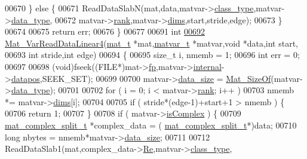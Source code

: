 \begin{DoxyCode}
{{{00670     \} \textcolor{keywordflow}{else} \{
00671         ReadDataSlabN(mat,data,matvar->\hyperlink{group___m_a_t_aff13035bf3265dd7d9425e5d40c839d4}{class\_type},matvar->\hyperlink{group___m_a_t_ab6aafe9bd77f0f077852593dec438144}{data\_type},
00672             matvar->\hyperlink{group___m_a_t_a84ba70c96ded13cc555fa75b768d9921}{rank},matvar->\hyperlink{group___m_a_t_a8e01234e1c862ce3472bb37f5a09b92c}{dims},start,stride,edge);
00673     \}
00674 
00675     \textcolor{keywordflow}{return} err;
00676 \}
00677 
00691 \textcolor{keywordtype}{int}
\hyperlink{group___m_a_t_gab9f3d6b362bfa1fa92ed2afb8281cff4}{00692} \hyperlink{group___m_a_t_gab9f3d6b362bfa1fa92ed2afb8281cff4}{Mat\_VarReadDataLinear4}(\hyperlink{struct__mat__t}{mat\_t} *mat,\hyperlink{group___m_a_t_structmatvar__t}{matvar\_t} *matvar,\textcolor{keywordtype}{void} *data,\textcolor{keywordtype}{int} start,
00693                        \textcolor{keywordtype}{int} stride,\textcolor{keywordtype}{int} edge)
00694 \{
00695     \textcolor{keywordtype}{size\_t} i, nmemb = 1;
00696     \textcolor{keywordtype}{int} err = 0;
00697 
00698     (void)fseek((FILE*)mat->\hyperlink{struct__mat__t_a85f562e407ca9ad4d2a6e14f839432b7}{fp},matvar->\hyperlink{group___m_a_t_a6e97e3ed9f40c49322c18561c2a94e92}{internal}->\hyperlink{structmatvar__internal_afd3bfaab126a160bd6855563e1ea0a7e}{datapos},SEEK\_SET);
00699 
00700     matvar->\hyperlink{group___m_a_t_a9ad1c82e2b568da617e12dc73a26e1f9}{data\_size} = \hyperlink{group__mat__util_gab6774aabdc124c540c1e7686d0804940}{Mat\_SizeOf}(matvar->\hyperlink{group___m_a_t_ab6aafe9bd77f0f077852593dec438144}{data\_type});
00701 
00702     \textcolor{keywordflow}{for} ( i = 0; i < matvar->\hyperlink{group___m_a_t_a84ba70c96ded13cc555fa75b768d9921}{rank}; i++ )
00703         nmemb *= matvar->\hyperlink{group___m_a_t_a8e01234e1c862ce3472bb37f5a09b92c}{dims}[i];
00704 
00705     if ( stride*(edge-1)+start+1 > nmemb ) \{
00706         \textcolor{keywordflow}{return} 1;
00707     \}
00708     \textcolor{keywordflow}{if} ( matvar->\hyperlink{group___m_a_t_aeb03b3a69f108dc05470b00443a43739}{isComplex} ) \{
00709             \hyperlink{group___m_a_t_structmat__complex__split__t}{mat\_complex\_split\_t} *complex\_data = (
      \hyperlink{group___m_a_t_structmat__complex__split__t}{mat\_complex\_split\_t}*)data;
00710             \textcolor{keywordtype}{long} nbytes = nmemb*matvar->\hyperlink{group___m_a_t_a9ad1c82e2b568da617e12dc73a26e1f9}{data\_size};
00711 
00712             ReadDataSlab1(mat,complex\_data->\hyperlink{group___m_a_t_a484a93607508adac2bce53a0252e0325}{Re},matvar->\hyperlink{group___m_a_t_aff13035bf3265dd7d9425e5d40c839d4}{class\_type},
}}}
\end{DoxyCode}
